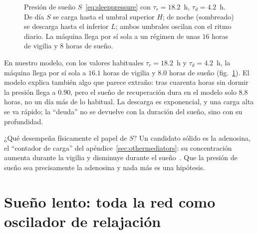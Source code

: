 \begin{figure}[t]
\centering
{}
\caption{Presión de sueño $S$~\eqref{eq:sleeppressure} con $\tau_r=18.2$~h, $\tau_d=4.2$~h. De día $S$ se carga hasta el umbral superior $H$; de noche (sombreado) se descarga hasta el inferior $L$; ambos umbrales oscilan con el ritmo diario. La máquina llega por sí sola a un régimen de unas $16$ horas de vigilia y $8$ horas de sueño.}
\label{fig:twoprocess}
\end{figure}

En nuestro modelo, con los valores habituales $\tau_r=18.2$~h y $\tau_d=4.2$~h, la máquina llega por sí sola a $16.1$ horas de vigilia y $8.0$ horas de sueño (fig.~\ref{fig:twoprocess}). El modelo explica también algo que parece extraño: tras cuarenta horas sin dormir la presión llega a $0.90$, pero el sueño de recuperación dura en el modelo solo $8.8$ horas, no un día más de lo habitual. La descarga es exponencial, y una carga alta se va rápido; la “deuda” no se devuelve con la duración del sueño, sino con su profundidad.

¿Qué desempeña físicamente el papel de $S$? Un candidato sólido es la adenosina, el “contador de carga” del apéndice~\ref{sec:othermediators}: su concentración aumenta durante la vigilia y disminuye durante el sueño~\cite{PorkkaHeiskanen1997,Dunwiddie2001}. Que la presión de sueño sea precisamente la adenosina y nada más es una hipótesis.

\section{Sueño lento: toda la red como oscilador de relajación}

